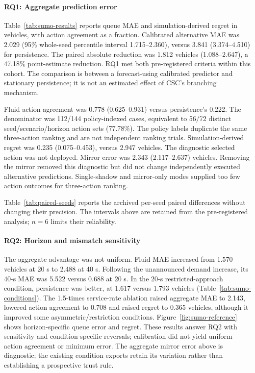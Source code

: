 \documentclass[conference,letterpaper]{IEEEtran}
\begin{document}




\paragraph{RQ1: Aggregate prediction error}
Table~\ref{tab:sumo-results} reports queue MAE and simulation-derived regret in
vehicles, with action agreement as a fraction. Calibrated alternative MAE was
2.029 (95\% whole-seed percentile interval 1.715--2.360), versus
3.841 (3.374--4.510) for persistence. The paired absolute reduction was
1.812 vehicles (1.088--2.647), a 47.18\% point-estimate reduction.
RQ1 met both pre-registered criteria within this cohort. The comparison is
between a forecast-using calibrated predictor and stationary persistence;
it is not an estimated effect of CSC's branching mechanism.

Fluid action agreement was 0.778 (0.625--0.931) versus persistence's 0.222.
The denominator was 112/144 policy-indexed cases, equivalent to 56/72 distinct
seed/scenario/horizon action sets (77.78\%). The policy labels duplicate the
same three-action ranking and are not independent ranking trials.
Simulation-derived regret was 0.235 (0.075--0.453), versus 2.947 vehicles.
The diagnostic selected action was not deployed. Mirror error was
2.343 (2.117--2.637) vehicles. Removing the mirror removed this diagnostic but
did not change independently executed alternative predictions. Single-shadow
and mirror-only modes supplied too few action outcomes for three-action ranking.

Table~\ref{tab:paired-seeds} reports the archived per-seed paired differences
without changing their precision. The intervals above are retained from the
pre-registered analysis; $n=6$ limits their reliability.


\paragraph{RQ2: Horizon and mismatch sensitivity}
The aggregate advantage was not uniform. Fluid MAE increased from 1.570 vehicles
at 20 s to 2.488 at 40 s. Following the unannounced demand increase, its 40-s
MAE was 5.522 versus 0.688 at 20 s. In the 20-s restricted-approach condition,
persistence was better, at 1.617 versus 1.793 vehicles
(Table~\ref{tab:sumo-conditions}). The 1.5-times service-rate ablation raised
aggregate MAE to 2.143, lowered action agreement to 0.708 and raised regret to
0.365 vehicles, although it improved some asymmetric/restriction conditions.
Figure~\ref{fig:sumo-reference} shows horizon-specific queue error and regret.
These results answer RQ2 with sensitivity and condition-specific reversals;
calibration did not yield uniform action agreement or minimum error.
The aggregate mirror error above is diagnostic; the existing condition exports
retain its variation rather than establishing a prospective trust rule.
\end{document}
